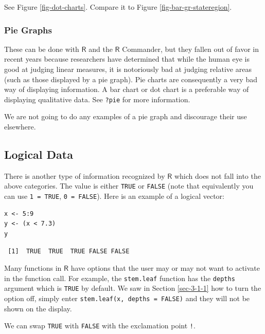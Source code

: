 \documentclass[captions=tableheading]{scrbook}
\begin{document}
\begin{example}
See Figure \ref{fig-dot-charts}. Compare it to Figure \ref{fig-bar-gr-stateregion}.

\end{example}
\subsubsection{Pie Graphs}
\label{sec-3-1-4-5}
\label{par:Pie-Graphs}


These can be done with \(\mathsf{R}\) and the \(\mathsf{R}\) Commander, but they fallen out of favor in recent years because researchers have determined that while the human eye is good at judging linear measures, it is notoriously bad at judging relative areas (such as those displayed by a pie graph). Pie charts are consequently a very bad way of displaying information. A bar chart or dot chart is a preferable way of displaying qualitative data. See \texttt{?pie} for more information.

We are not going to do any examples of a pie graph and discourage their use elsewhere. 
\subsection{Logical Data}
\label{sec-3-1-5}
\label{sub-Logical-Data}


There is another type of information recognized by \(\mathsf{R}\) which does not fall into the above categories. The value is either \texttt{TRUE} or \texttt{FALSE} (note that equivalently you can use \texttt{1 = TRUE}, \texttt{0 = FALSE}). Here is an example of a logical vector:


\begin{verbatim}
x <- 5:9
y <- (x < 7.3)
y
\end{verbatim}

\begin{verbatim}
 [1]  TRUE  TRUE  TRUE FALSE FALSE
\end{verbatim}

Many functions in \(\mathsf{R}\) have options that the user may or may not want to activate in the function call. For example, the \texttt{stem.leaf} function has the \texttt{depths} argument which is \texttt{TRUE} by default. We saw in Section \ref{sec-3-1-1} how to turn the option off, simply enter \texttt{stem.leaf(x, depths = FALSE)} and they will not be shown on the display.

We can swap \texttt{TRUE} with \texttt{FALSE} with the exclamation point \texttt{!}.
\end{document}
